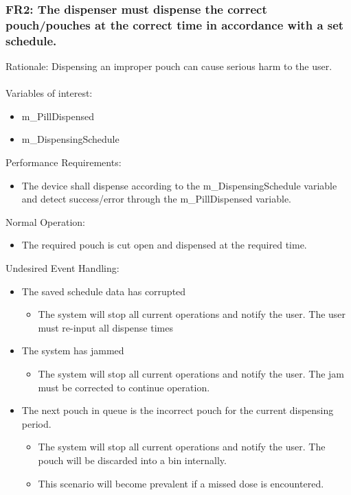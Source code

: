 \documentclass[12pt]{article}
\begin{document}
\subsubsection*{FR2: The dispenser must dispense the correct pouch/pouches at the correct time in accordance with a set schedule.}
Rationale: Dispensing an improper pouch  can cause serious harm to the user.  
\\\\
Variables of interest:
\begin{itemize}[noitemsep,topsep=0pt]
    \item m\_PillDispensed
    \item m\_DispensingSchedule
\end{itemize} 
\bigskip
Performance Requirements:
\begin{itemize}[noitemsep,topsep=0pt]
    \item  The device shall dispense according to the m\_DispensingSchedule variable and detect success/error through the m\_PillDispensed variable.
\end{itemize}
\bigskip
Normal Operation:
\begin{itemize}[noitemsep,topsep=0pt]
     \item The required pouch is cut open and dispensed at the required time.
\end{itemize}
\bigskip
Undesired Event Handling:
\begin{itemize}[noitemsep,topsep=0pt]
    \item The saved schedule data has corrupted
    \begin{itemize}
        \item The system will stop all current operations and notify the user. The user must re-input all dispense times
    \end{itemize}
    \item The system has jammed
    \begin{itemize}
        \item The system will stop all current operations and notify the user. The jam must be corrected to continue operation.
    \end{itemize}
        \item The next pouch in queue is the incorrect pouch for the current dispensing period.
    \begin{itemize}
        \item The system will stop all current operations and notify the user. The pouch will be discarded into a bin internally.
        \item This scenario will become prevalent if a missed dose is encountered.
    \end{itemize}
\end{itemize}
\bigskip
\end{document}

